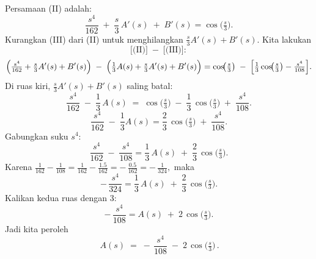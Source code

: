 \documentclass[a4paper]{article}
\theoremstyle{definition}
\begin{document}
\begin{enumerate}
\begin{enumerate}
      Persamaan (II) adalah:
      \[
      \frac{s^{4}}{162} 
      \;+\;\frac{s}{3}\,A'(s) 
      \;+\; B'(s) 
      = \cos\!\bigl(\tfrac{s}{3}\bigr).
      \]
      Kurangkan (III) dari (II) untuk menghilangkan \(\tfrac{s}{3}A'(s) + B'(s)\). Kita lakukan
      \[
      \bigl[\text{(II)}\bigr] \;-\; \bigl[\text{(III)}\bigr]:
      \]
      \[
      \Bigl(\tfrac{s^{4}}{162} + \tfrac{s}{3}A'(s) + B'(s)\Bigr)
      \;-\; \Bigl(\tfrac{1}{3}A(s) + \tfrac{s}{3}A'(s) + B'(s)\Bigr)
      = \cos\!\bigl(\tfrac{s}{3}\bigr)
        \;-\;\Bigl[\tfrac{1}{3}\cos\!\bigl(\tfrac{s}{3}\bigr) - \tfrac{s^{4}}{108}\Bigr].
      \]
      Di ruas kiri, \(\tfrac{s}{3}A'(s) + B'(s)\) saling batal:
      \[
      \frac{s^{4}}{162} \;-\; \frac{1}{3}\,A(s)
      \;=\; \cos\!\bigl(\tfrac{s}{3}\bigr) 
         \;-\; \frac{1}{3}\,\cos\!\bigl(\tfrac{s}{3}\bigr) 
         \;+\; \frac{s^{4}}{108}.
      \]
      \[
      \frac{s^{4}}{162} \;-\; \frac{1}{3}A(s)
      = \frac{2}{3}\,\cos\!\bigl(\tfrac{s}{3}\bigr)
        \;+\; \frac{s^{4}}{108}.
      \]
      Gabungkan suku \(s^{4}\):
      \[
      \frac{s^{4}}{162} \;-\; \frac{s^{4}}{108}
      = \frac{1}{3}\,A(s) 
      \;+\; \frac{2}{3}\,\cos\!\bigl(\tfrac{s}{3}\bigr).
      \]
      Karena \(\tfrac{1}{162} - \tfrac{1}{108} = \tfrac{1}{162} - \tfrac{1.5}{162} = -\,\tfrac{0.5}{162} = -\,\tfrac{1}{324},\) maka
      \[
      -\,\frac{s^{4}}{324}
      = \frac{1}{3}\,A(s) \;+\; \frac{2}{3}\,\cos\!\bigl(\tfrac{s}{3}\bigr).
      \]
      Kalikan kedua ruas dengan 3:
      \[
      -\,\frac{s^{4}}{108}
      = A(s) \;+\; 2\,\cos\!\bigl(\tfrac{s}{3}\bigr).
      \]
      Jadi kita peroleh
      \[
      \boxed{\,A(s) \;=\; -\,\frac{s^{4}}{108} \;-\; 2\,\cos\!\bigl(\tfrac{s}{3}\bigr)\,.}
      \tag{IV}
      \]


\end{enumerate}
\end{enumerate}
\end{document}
